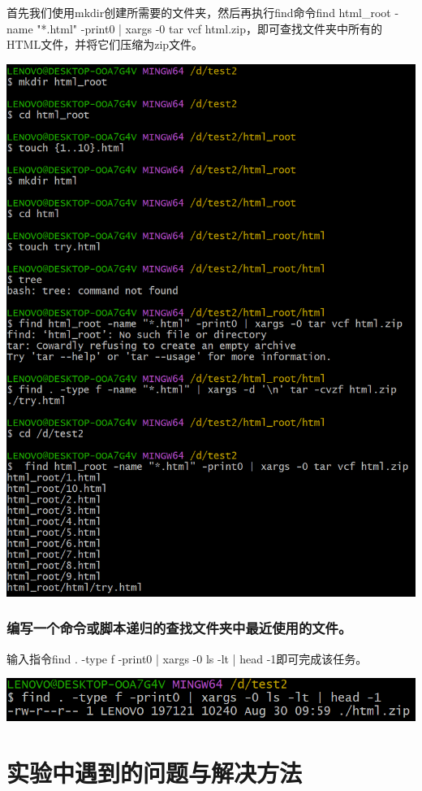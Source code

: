 \documentclass[UTF8,a4paper]{ctexart}
\begin{document}
\begin{sloppypar}
	首先我们使用mkdir创建所需要的文件夹，然后再执行find命令find html\_root -name "*.html" -print0 | xargs -0 tar vcf html.zip，即可查找文件夹中所有的HTML文件，并将它们压缩为zip文件。

	\includegraphics[width = 16cm]{12}

	
	\subsubsection{编写一个命令或脚本递归的查找文件夹中最近使用的文件。}
	输入指令find . -type f -print0 | xargs -0 ls -lt | head -1即可完成该任务。
	
	\includegraphics[width = 16cm]{13}
	
	\section{实验中遇到的问题与解决方法}

\end{sloppypar}
\end{document}
